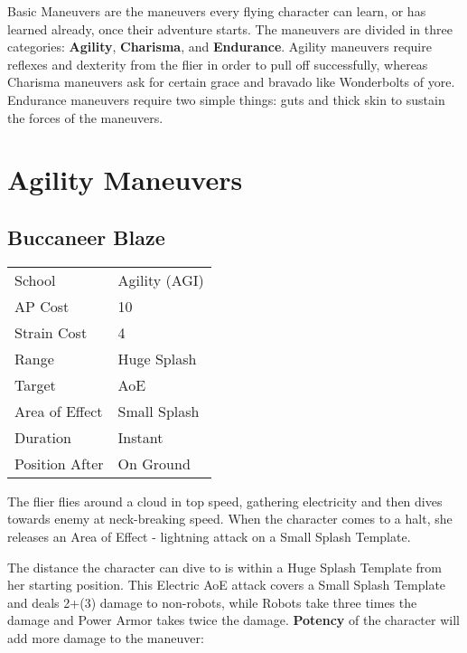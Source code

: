 \documentclass[11pt,a4paper,twocolumn]{book}
\begin{document}
Basic Maneuvers are the maneuvers every flying character can learn, or has learned already, once their adventure starts. The maneuvers are divided in three categories: \textbf{Agility}, \textbf{Charisma}, and \textbf{Endurance}. Agility maneuvers require reflexes and dexterity from the flier in order to pull off successfully, whereas Charisma maneuvers ask for certain grace and bravado like Wonderbolts of yore. Endurance maneuvers require two simple things: guts and thick skin to sustain the forces of the maneuvers.

\vfill

\section*{Agility Maneuvers}

\subsection*{Buccaneer Blaze}

{
	\begin{tabu} to 75mm{| X[l,4] | X[l,7] |}
		\hline
		School 			& Agility (AGI) \\
		AP Cost	      	& 10 			\\
		Strain Cost     & 4 			\\
		Range     		& Huge Splash 	\\
		Target      	& AoE 			\\
		Area of Effect  & Small Splash 	\\
		Duration     	& Instant 		\\
		Position After  & On Ground     \\ \hline
	\end{tabu}
	
}

\medskip
The flier flies around a cloud in top speed, gathering electricity  and then dives towards enemy at neck-breaking speed. When the character comes to a halt, she releases an Area of Effect - lightning attack on a Small Splash Template.

The distance the character can dive to is within a Huge Splash Template from her starting position. This Electric AoE attack covers a Small Splash Template and deals 2+(3) damage to non-robots, while Robots take three times the damage and Power Armor takes twice the damage. \textbf{Potency} of the character will add more damage to the maneuver:
\end{document}
